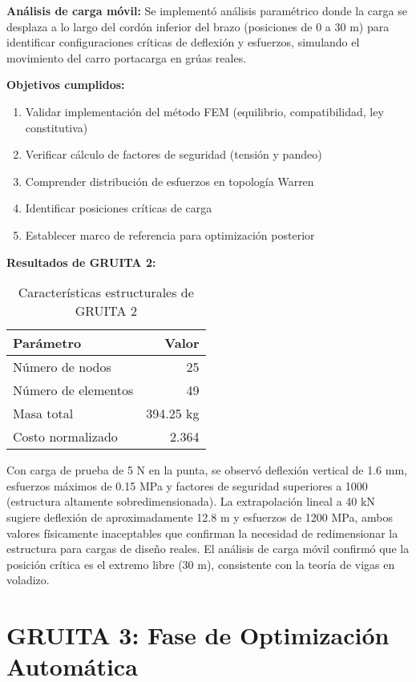 \documentclass[10pt,a4paper]{article}
\begin{document}
\textbf{Análisis de carga móvil:} Se implementó análisis paramétrico donde la carga se desplaza a lo largo del cordón inferior del brazo (posiciones de 0 a 30 m) para identificar configuraciones críticas de deflexión y esfuerzos, simulando el movimiento del carro portacarga en grúas reales.

\textbf{Objetivos cumplidos:}
\begin{enumerate}
\item Validar implementación del método FEM (equilibrio, compatibilidad, ley constitutiva)
\item Verificar cálculo de factores de seguridad (tensión y pandeo)
\item Comprender distribución de esfuerzos en topología Warren
\item Identificar posiciones críticas de carga
\item Establecer marco de referencia para optimización posterior
\end{enumerate}

\textbf{Resultados de GRUITA 2:}

\begin{table}[H]
\small
\centering
\caption{Características estructurales de GRUITA 2}
\begin{tabular}{lr}
\toprule
\textbf{Parámetro} & \textbf{Valor} \\
\midrule
Número de nodos & 25 \\
Número de elementos & 49 \\
Masa total & 394.25 kg \\
Costo normalizado & 2.364 \\
\bottomrule
\end{tabular}
\end{table}

Con carga de prueba de 5 N en la punta, se observó deflexión vertical de 1.6 mm, esfuerzos máximos de 0.15 MPa y factores de seguridad superiores a 1000 (estructura altamente sobredimensionada). La extrapolación lineal a 40 kN sugiere deflexión de aproximadamente 12.8 m y esfuerzos de 1200 MPa, ambos valores físicamente inaceptables que confirman la necesidad de redimensionar la estructura para cargas de diseño reales. El análisis de carga móvil confirmó que la posición crítica es el extremo libre (30 m), consistente con la teoría de vigas en voladizo.

\section{GRUITA 3: Fase de Optimización Automática}
\end{document}
